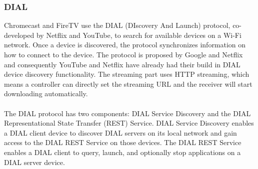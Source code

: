 \subsubsection{DIAL} 
Chromecast and FireTV use the DIAL \cite{dial} (DIscovery And Launch) protocol,
co-developed by Netflix and YouTube, to search for available devices on a Wi-Fi network. 
Once a device is discovered, the protocol synchronizes information on how to 
connect to the device. The protocol is proposed by Google and Netflix and consequently 
YouTube and Netflix  have already had their build in DIAL device discovery functionality. The 
streaming part uses HTTP streaming, which means a controller can directly set the 
streaming URL and the receiver will start downloading automatically. \\
\\
The DIAL protocol has two components: DIAL Service Discovery and the DIAL 
Representational State Transfer (REST) Service. DIAL Service Discovery enables a 
DIAL client device to discover DIAL servers on its local network and gain access to the DIAL REST Service on those devices. The DIAL REST Service enables a DIAL client to query, launch, and optionally stop applications on a DIAL server device. 
